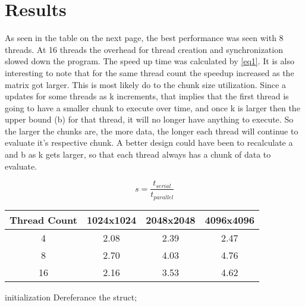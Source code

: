 \documentclass[12pt]{article}
\begin{document}
\vspace{-0.6cm}
\section{Results}
\vspace{-0.4cm}
\qquad As seen in the table on the next page, the best performance was seen
with 8 threads. At 16 threads the overhead for thread creation and
synchronization slowed down the program. The speed up time was calculated by
\eqref{eq1}. It is also interesting to note that for the same thread count
the speedup increased as the matrix got larger. This is most likely do to
the chunk size utilization. Since a updates for some threads as k
increments, that implies that the first thread is going to have a smaller
chunk to execute over time, and once k is larger then the upper bound (b) 
for that thread, it will no longer have anything to execute. So the larger
the chunks are, the more data, the longer each thread will continue to
evaluate it's respective chunk. A better design could have been to
recalculate a and b as k gets larger, so that each thread always has a chunk
of data to evaluate. 

\begin{equation}
    s = \frac{t_{serial}}{t_{parallel}}\label{eq1}
\end{equation}

\pagebreak

\begin{center}
\hspace*{-2.5cm}
\begin{tabular}{@{}|c|c|c|c|}
\hline
Thread Count & 1024x1024 & 2048x2048 & 4096x4096 \\
\hline
4 & 2.08 & 2.39 & 2.47 \\
\hline
8 & 2.70 & 4.03 & 4.76  \\
\hline 
16 & 2.16 & 3.53 & 4.62 \\
\hline
\end{tabular}
\hspace*{-2.5cm}
\end{center}

\vspace{1cm}
\begin{algorithm}[H]
\SetAlgoLined
{}
initialization\;
Dereferance the struct; 
\end{algorithm}

\end{document}
